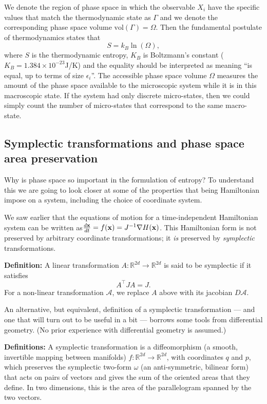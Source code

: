 We denote the region of phase space in which the observable $X_i$ have the specific values that match the thermodynamic state as $\Gamma$ and we denote the corresponding phase space volume $\text{vol}(\Gamma)=\Omega$. Then the fundamental postulate of thermodynamics states that
\begin{equation}
	S = k_B\ln(\Omega),
	\label{eqS}
\end{equation}
where $S$ is the thermodynamic entropy, $K_B$ is Boltzmann's constant ($K_B = 1.384\times10^{-23}$J/K) and the equality should be interpreted as meaning ``is equal, up to terms of size $\epsilon_i$''. The accessible phase space volume $\Omega$ measures the amount of the phase space available to the microscopic system while it is in this macroscopic state. If the system had only discrete micro-states, then we could simply count the number of micro-states that correspond to the same macro-state. 


\subsection{Symplectic transformations and phase space area preservation}
Why is phase space so important in the formulation of entropy? To understand this we are going to look closer at some of the properties that being Hamiltonian impose on a system, including the choice of coordinate system.

We saw earlier that the equations of motion for a time-independent Hamiltonian system can be written as$ \frac{d{\bf x}}{dt} = f({\bf x}) = J^{-1}\nabla H({\bf x})$. This Hamiltonian form is not preserved by arbitrary coordinate transformations; it \emph{is} preserved by \emph{symplectic} transformations.

{\bf Definition:} A linear transformation $A: \mathbb{R}^{2d}\rightarrow\mathbb{R}^{2d}$ is said to be symplectic if it satisfies
$$ A^\top J A = J.$$
For a non-linear transformation $\mathcal{A}$, we replace $A$ above with its jacobian $D\mathcal{A}$.

An alternative, but equivalent, definition of a symplectic transformation --- and one that will turn out to be useful in a bit --- borrows some tools from differential geometry. (No prior experience with differential geometry is assumed.)

{\bf Definitions:} A symplectic transformation is a diffeomorphism (a smooth, invertible mapping between manifolds) $f:\mathbb{R}^{2d}\rightarrow\mathbb{R}^{2d}$, with coordinates $q$ and $p$, which preserves the symplectic two-form $\omega$ (an anti-symmetric, bilinear form) that acts on pairs of vectors and gives the sum of the oriented areas that they define. In two dimensions, this is the area of the parallelogram spanned by the two vectors.

